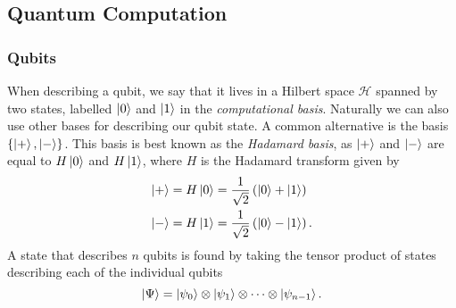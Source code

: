 \subsection{Quantum Computation}
\subsubsection{Qubits}
\label{subsubsection:qubits}
When describing a qubit, we say that it lives in a Hilbert space $\mathcal{H}$ spanned by two states, labelled $\ket{0}$ and $\ket{1}$ in the \emph{computational basis}. Naturally we can also use other bases for describing our qubit state. A common alternative is the basis $\{\ket{+}, \ket{-}\}$.
This basis is best known as the \emph{Hadamard basis}, as $\ket{+}$ and $\ket{-}$ are equal to $H\ket{0}$ and $H\ket{1}$, where $H$ is the Hadamard transform given by
\begin{align}
    \ket{+} &= H\ket{0} = \frac{1}{\sqrt2} \left(\ket{0} + \ket{1}\right)\\
    \ket{-} &= H\ket{1} = \frac{1}{\sqrt2} \left(\ket{0} - \ket{1}\right).
\end{align}
A state that describes $n$ qubits is found by taking the tensor product of states describing each of the individual qubits
\begin{equation}
    \ket{\Psi} = \ket{\psi_0} \otimes \ket{\psi_1} \otimes \dots \otimes \ket{\psi_{n-1}}.
\end{equation}

